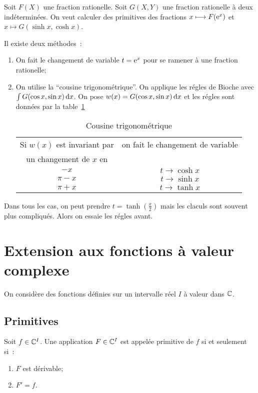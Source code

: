 Soit \(F(X)\) une fraction rationelle. Soit \(G(X,Y)\) une fraction rationelle à deux indéterminées. On veut calculer des primitives des fractions \(x \longmapsto F(\operatorname{e}^x)\) et \(x \longmapsto G(\sinh x,\cosh x)\).

Il existe deux méthodes~:
\begin{enumerate}
\item On fait le changement de variable \(t=\operatorname{e}^x\) pour se ramener à une fraction rationelle;
\item On utilise la ``cousine trigonométrique''. On applique les régles de Bioche avec \(\int G(\cos x,\sin x)\mathop{}\mathopen{}\mathrm{d} x\). On pose \(w(x) = G(\cos x,\sin x) \mathop{}\mathopen{}\mathrm{d} x\) et les régles sont données par la table~\ref{tab:cousinetrigo}

\begin{table}[!h]
  \centering
  \begin{tabular}{|c|c|}\hline
    Si \(w(x)\) est invariant par & on fait le changement de variable \\
    un changement de \(x\) en &  \\ \hline
    \(-x\) & \(t \to \cosh x\)\\
    \(\pi-x\) & \(t \to \sinh x\)\\
    \(\pi+x\) & \(t \to \tanh x\)\\
  \hline\end{tabular}
  \caption{Cousine trigonométrique}
  \label{tab:cousinetrigo}
\end{table}
\end{enumerate}

Dans tous les cas, on peut prendre \(t=\tanh\left(\frac{x}{2}\right)\) mais les claculs sont souvent plus compliqués. Alors on essaie les régles avant.

\section{Extension aux fonctions à valeur complexe}

On considère des fonctions définies sur un intervalle réel \(I\) à valeur dans \(\mathbb{C}\).

\subsection{Primitives}

\begin{defdef}
  Soit \(f \in \mathbb{C}^I\). Une application \(F \in \mathbb{C}^I\) est appelée primitive de \(f\) si et seulement si~:
  \begin{enumerate}
  \item \(F\) est dérivable;
  \item \(F'=f\).
  \end{enumerate}
\end{defdef}

